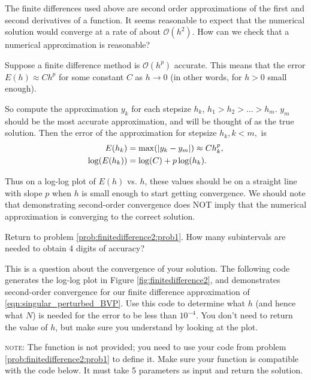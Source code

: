 The finite differences used above are second order approximations of the first and second derivatives of a function.  It seems reasonable to expect that the numerical solution would converge at a rate of about $\mathcal{O}(h^2)$. How can we check that a numerical approximation is reasonable?

Suppose a finite difference method is $\mathcal{O}(h^p)$ accurate.
This means that the error $E(h) \approx Ch^p$ for some constant $C$ as $h \to 0$ (in other words, for $h>0$ small enough).

So compute the approximation $y_k$ for each stepsize $h_k$, $h_1 > h_2> \ldots>h_m$.
$y_m$ should be the most accurate approximation, and will be thought of as the true solution.
Then the error of the approximation for
stepsize $h_k, k < m,$ is
\begin{align*}
	E(h_k) &= \max( \left\lvert y_k - y_m\right\rvert) \approx C h_k^p ,\\
	\log(E(h_k)) &= \log(C) + p \log(h_k).
\end{align*}

Thus on a log-log plot of $E(h)$ vs. $h$, these values should be on a straight line with slope $p$ when $h$ is small enough to start getting convergence. We should note that demonstrating second-order convergence does NOT imply that the numerical approximation is converging to the correct solution.


\begin{problem}
Return to problem \ref{prob:finitedifference2:prob1}.   How many subintervals are needed to obtain 4 digits of accuracy?

This is a question about the convergence of your solution.
The following code generates the log-log plot in Figure \ref{fig:finitedifference2}, and demonstrates second-order convergence for our finite difference approximation of \eqref{eqn:singular_perturbed_BVP}.
Use this code to determine what $h$ (and hence what $N$) is needed for the error to be less than $10^{-4}$.
You don't need to return the value of $h$, but make sure you understand by looking at the plot.

\textsc{note}: The function  is not provided; you need to use your code from problem \ref{prob:finitedifference2:prob1} to define it.  Make sure your function is compatible with the code below.  It must take 5 parameters as input and return the solution.

	\label{prob:finitedifference2:prob2}
\end{problem}


